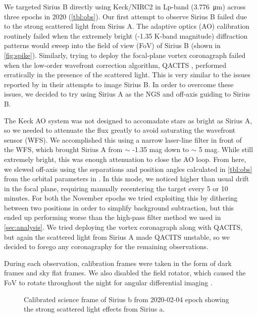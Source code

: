 \documentclass[twocolumn]{aastex631}
\begin{document}
We targeted Sirius B directly using Keck/NIRC2 in Lp-band (\qty{3.776}{\micro\meter}) across three epochs in 2020 (\autoref{tbl:obs}). Our first attempt to observe Sirius B failed due to the strong scattered light from Sirius A. The adaptive optics (AO) calibration routinely failed when the extremely bright (-1.35 K-band magnitude) diffraction patterns would sweep into the field of view (FoV) of Sirius B (shown in \autoref{fig:spike}). Similarly, trying to deploy the focal-plane vortex coronagraph \citep{serabyn_w_2017} failed when the low-order wavefront correction algorithm, QACITS \citep{huby_w_2017}, performed erratically in the presence of the scattered light. This is very similar to the issues reported by \citet[\S2]{vigan_high-contrast_2015}  in their attempts to image Sirius B. In order to overcome these issues, we decided to try using Sirius A as the NGS and off-axis guiding to Sirius B.

The Keck AO system \citep{wizinowich_performance_2000} was not designed to accomadate stars as bright as Sirius A, so we needed to attenuate the flux greatly to avoid saturating the wavefront sensor (WFS). We accomplished this using a narrow laser-line filter in front of the WFS, which brought Sirius A from $\sim$ -1.35 mag down to $\sim$ 5 mag. While still extremely bright, this was enough attenuation to close the AO loop. From here, we slewed off-axis using the separations and position angles calculated in \autoref{tbl:obs} from the orbital parameters in \cite{bond_sirius_2017}. In this mode, we noticed higher than usual drift in the focal plane, requiring manually recentering the target every 5 or 10 minutes. For both the November epochs we tried exploiting this by dithering between two positions in order to simplify background subtraction, but this ended up performing worse than the high-pass filter method we used in \autoref{sec:analysis}. We tried deploying the vortex coronagraph along with QACITS, but again the scattered light from Sirius A made QACITS unstable, so we decided to forego any coronagraphy for the remaining observations.

During each observation, calibration frames were taken in the form of dark frames and sky flat frames. We also disabled the field rotator, which caused the FoV to rotate throughout the night for angular differential imaging \citep[ADI;][]{marois_angular_2006}.

\begin{figure}
    \centering
    \caption{Calibrated science frame of Sirius b from 2020-02-04 epoch showing the strong scattered light effects from Sirius a.}
    \label{fig:spike}
\end{figure}
\end{document}

